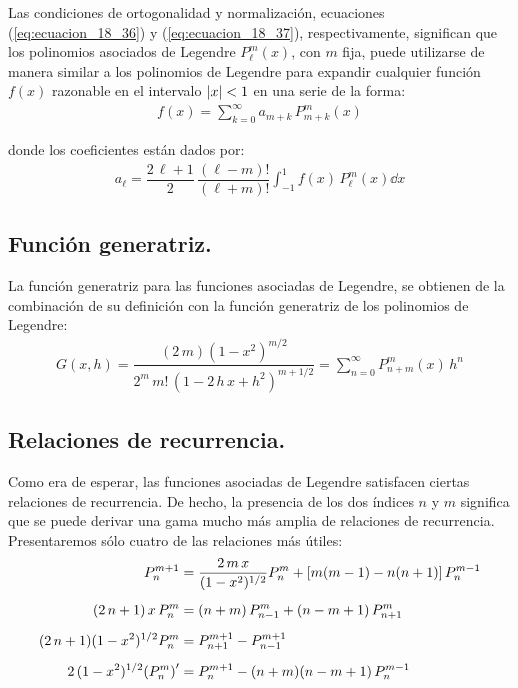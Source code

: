 Las condiciones de ortogonalidad y normalización, ecuaciones (\ref{eq:ecuacion_18_36}) y (\ref{eq:ecuacion_18_37}), respectivamente, significan que los polinomios asociados de Legendre $P_{\ell}^{m}(x)$, con $m$ fija, puede utilizarse de manera similar a los polinomios de Legendre para expandir cualquier función $f(x)$ razonable en el intervalo $\abs{x} < 1$ en una serie de la forma:
\begin{align}
f(x) = \sum_{k=0}^{\infty} a_{m+k} \, P_{m+k}^{m} (x)
\label{eq:ecuacion_18_38}
\end{align}

donde los coeficientes están dados por:
\begin{align*}
a_{\ell} = \dfrac{2 \, \ell + 1}{2} \, \dfrac{(\ell - m)!}{(\ell + m)!} \int_{-1}^{1} f(x) \, P_{\ell}^{m} (x) \dd{x}
\end{align*}

\subsection{Función generatriz.}

La función generatriz para las funciones asociadas de Legendre, se obtienen de la combinación de su definición con la función generatriz de los polinomios de Legendre:
\begin{align}
G(x, h) = \dfrac{(2 \, m)(1 - x^{2})^{m/2}}{2^{m} \, m! \, (1 - 2 \, h \, x + h^{2})^{m+1/2}} = \sum_{n=0}^{\infty} P_{n+m}^{m} (x) \, h^{n}
\label{eq:ecuacion_18_40}
\end{align}

\subsection{Relaciones de recurrencia.}

Como era de esperar, las funciones asociadas de Legendre satisfacen ciertas relaciones de recurrencia. De hecho, la presencia de los dos índices $n$ y $m$ significa que se puede derivar una gama mucho más amplia de relaciones de recurrencia. Presentaremos sólo cuatro de las relaciones más útiles:
\begin{align*}
P_{n}^{m+1} &= \dfrac{2 \, m \, x}{(1 - x^{2})^{1/2}} P_{n}^{m} + [m (m - 1) - n (n + 1)] \, P_{n}^{m-1} \\[0.5em]
(2 \, n + 1) \, x \, P_{n}^{m} &= (n + m) \, P_{n-1}^{m} + (n - m + 1) \, P_{n+1}^{m} \\[0.5em]
(2 \, n + 1)(1 -  x^{2})^{1/2} P_{n}^{m} &= P_{n+1}^{m+1} - P_{n-1}^{m+1} \\[0.5em]
2 \, (1 - x^{2})^{1/2} {(P_{n}^{m})}^{\prime} &= P_{n}^{m+1} - (n + m)(n - m + 1) \, P_{n}^{m-1}
\end{align*}

